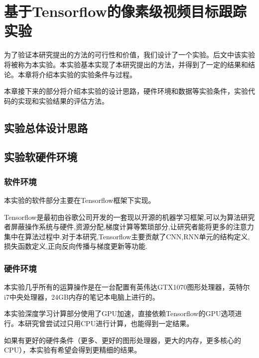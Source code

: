 
\chapter{基于Tensorflow的像素级视频目标跟踪实验}
为了验证本研究提出的方法的可行性和价值，我们设计了一个实验。后文中该实验将被称为本实验。本实验基本实现了本研究提出的方法，并得到了一定的结果和结论。本章将介绍本实验的实验条件与过程。
\par
本章接下来的部分将介绍本实验的设计思路，硬件环境和数据等实验条件，实验代码的实现和实验结果的评估方法。

\section{实验总体设计思路}


\section{实验软硬件环境}
\subsection{软件环境}
本实验的软件部分主要在Tensorflow\supercite{abadi2016tensorflow}框架下实现。
\par
Tensorflow是最初由谷歌公司开发的一套现以开源的机器学习框架,可以为算法研究者屏蔽操作系统与硬件,资源分配,梯度计算等繁琐部分,让研究者能将更多的注意力集中在算法过程中.对于本研究,Tensorflow主要贡献了CNN,RNN单元的结构定义,损失函数定义,正向反向传播与梯度更新等功能.
\par

\subsection{硬件环境}
本实验几乎所有的运算操作是在一台配置有英伟达GTX1070图形处理器，英特尔i7中央处理器，24GB内存的笔记本电脑上进行的。
\par
本实验深度学习计算部分使用了GPU加速，直接依赖Tensorflow的GPU选项进行。本研究曾尝试过只用CPU进行计算，也能得到一定结果。
\par
如果有更好的硬件条件（更多、更好的图形处理器，更大的内存，更多核心的CPU），本实验有希望会得到更精细的结果。

